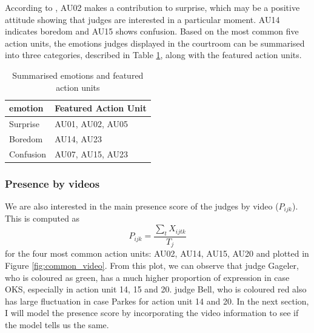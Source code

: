 \documentclass{monashthesis}
\begin{document}
According to \textcite{ekman2002facial}, AU02 makes a contribution to surprise, which may be a positive attitude showing that judges are interested in a particular moment. AU14 indicates boredom and AU15 shows confusion. Based on the most common five action units, the emotions judges displayed in the courtroom can be summarised into three categories, described in Table \ref{tab:three_category}, along with the featured action units.

\begin{table}

\caption{\label{tab:emotion-table}\label{tab:three_category}Summarised emotions and featured action units}
\centering
\begin{tabular}[t]{l|l}
\hline
emotion & Featured Action Unit\\
\hline
Surprise & AU01, AU02, AU05\\
\hline
Boredom & AU14, AU23\\
\hline
Confusion & AU07, AU15, AU23\\
\hline
\end{tabular}
\end{table}

\hypertarget{presence-by-videos}{%
\subsubsection{Presence by videos}\label{presence-by-videos}}

We are also interested in the main presence score of the judges by video (\(P_{ijk}\)). This is computed as \[P_{ijk} = \frac{\sum_{t}X_{ijtk}}{T_j}\] for the four most common action units: AU02, AU14, AU15, AU20 and plotted in Figure \ref{fig:common_video}. From this plot, we can observe that judge Gageler, who is coloured as green, has a much higher proportion of expression in case OKS, especially in action unit 14, 15 and 20. judge Bell, who is coloured red also has large fluctuation in case Parkes for action unit 14 and 20. In the next section, I will model the presence score by incorporating the video information to see if the model tells us the same.
\end{document}
